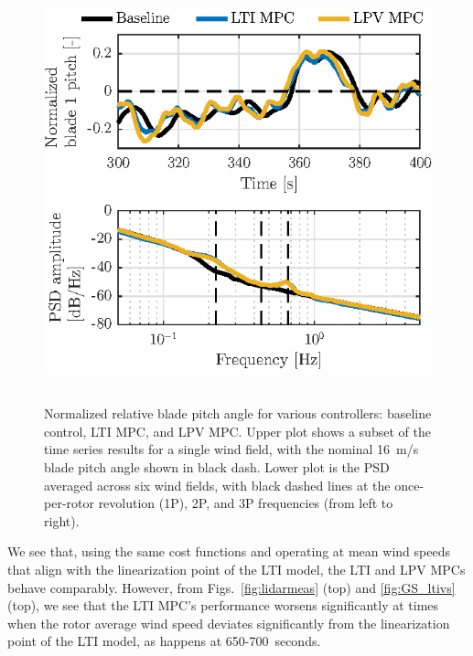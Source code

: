 \documentclass[letterpaper, 10 pt, conference]{ieeeconf}  %
\begin{document}
\begin{figure}[thbp]
	\centering
	\mbox{\includegraphics[scale=1.0]{B1_ltivs.eps}
	}
	\caption{Normalized relative blade pitch angle for various controllers: baseline control, LTI MPC, and LPV MPC. Upper plot shows a subset of the time series results for a single wind field, with the nominal 16~m/s blade pitch angle shown in black dash. Lower plot is the PSD averaged across six wind fields, with black dashed lines at the once-per-rotor revolution (1P), 2P, and 3P frequencies (from left to right).}
	\label{fig:B1_ltivs}
\end{figure}

We see that, using the same cost functions and operating at mean wind speeds that align with the linearization point of the LTI model, the LTI and LPV MPCs behave comparably. However, from Figs.~\ref{fig:lidarmeas} (top) and \ref{fig:GS_ltivs} (top), we see that the LTI MPC's performance worsens significantly at times when the rotor average wind speed deviates significantly from the linearization point of the LTI model, as happens at 650-700~seconds. 
\end{document}
